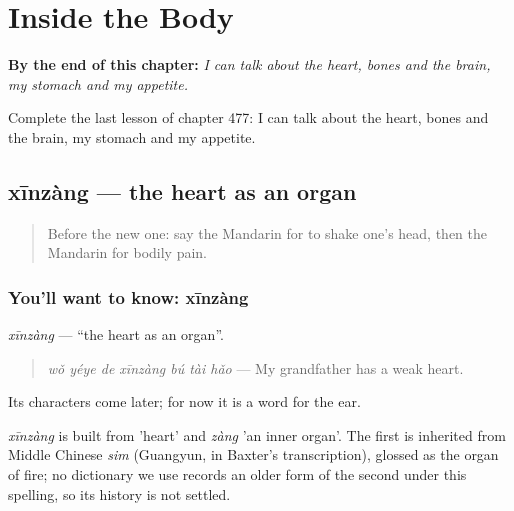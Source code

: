 
\chapter{Inside the Body}
\label{ch:zh-inside-the-body}

\begin{chapteropening}
\textbf{By the end of this chapter:} \emph{I can talk about the heart, bones and the brain, my stomach and my appetite.}

Complete the last lesson of chapter 477: I can talk about the heart, bones and the brain, my stomach and my appetite.
\end{chapteropening}

\section[xīnzàng]{xīnzàng — the heart as an organ}

\label{lesson:ZH-C477-xinzang}



\begin{quote}
Before the new one: say the Mandarin for to shake one's head, then the Mandarin for bodily pain.
\end{quote}

\subsection*{You'll want to know: xīnzàng}
\emph{xīnzàng} — \textquotedblleft{}the heart as an organ\textquotedblright{}.

\begin{quote}
\emph{wǒ yéye de xīnzàng bú tài hǎo} — My grandfather has a weak heart.
\end{quote}

Its characters come later; for now it is a word for the ear.

\begin{cousinweb}
\emph{xīnzàng} is built from  'heart' and \emph{zàng} 'an inner organ'. The first is inherited from Middle Chinese \emph{sim} (Guangyun, in Baxter's transcription), glossed as the organ of fire; no dictionary we use records an older form of the second under this spelling, so its history is not settled.
\end{cousinweb}

